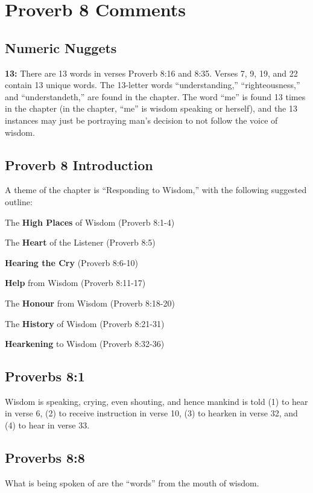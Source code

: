 \section{Proverb 8 Comments}

\subsection{Numeric Nuggets}
\textbf{13:} There are 13 words in verses Proverb 8:16 and 8:35. Verses 7, 9, 19, and 22 contain 13 unique words. The 13-letter words ``understanding,'' ``righteousness,'' and ``understandeth,'' are found in the chapter. The word ``me'' is found 13 times in the chapter (in the chapter, ``me'' is wisdom speaking or herself), and the 13 instances may just be portraying man's decision to not follow the voice of wisdom.

\subsection{Proverb 8 Introduction}
A theme of the chapter is ``Responding to Wisdom,'' with the following suggested outline:
\begin{compactenum}
    \item The \textbf{High Places} of Wisdom (Proverb 8:1-4)
    \item The \textbf{Heart} of the Listener (Proverb 8:5)
    \item \textbf{Hearing the Cry} (Proverb 8:6-10)
    \item \textbf{Help} from Wisdom (Proverb 8:11-17)
    \item The \textbf{Honour} from Wisdom (Proverb 8:18-20)
    \item The \textbf{History} of Wisdom (Proverb 8:21-31)
    \item \textbf{Hearkening} to Wisdom (Proverb 8:32-36)
\end{compactenum}

\subsection{Proverbs 8:1}
Wisdom is speaking, crying, even shouting, and hence mankind is told (1) to hear  in verse 6, (2) to receive instruction in verse 10, (3) to hearken in verse 32, and (4) to hear in verse 33. \cite{ruckman1972proverbs}


\subsection{Proverbs 8:8}
What is being spoken of are the ``words'' from the mouth of wisdom.

